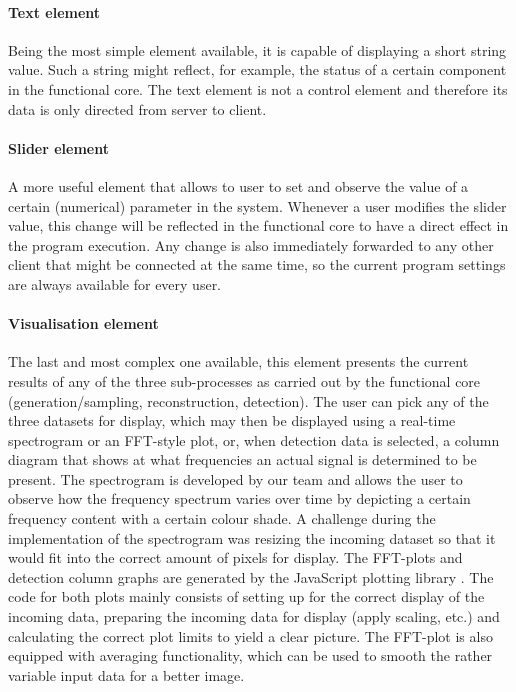 \documentclass[a4paper, openany, oneside]{memoir}
\begin{document}
\paragraph{Text element}
Being the most simple element available, it is capable of displaying a short string value. Such a string might reflect, for example, the status of a certain component in the functional core. The text element is not a control element and therefore its data is only directed from server to client.

\paragraph{Slider element}
A more useful element that allows to user to set and observe the value of a certain (numerical) parameter in the system. Whenever a user modifies the slider value, this change will be reflected in the functional core to have a direct effect in the program execution. Any change is also immediately forwarded to any other client that might be connected at the same time, so the current program settings are always available for every user.

\paragraph{Visualisation element}
The last and most complex one available, this element presents the current results of any of the three sub-processes as carried out by the functional core (generation/sampling, reconstruction, detection). The user can pick any of the three datasets for display, which may then be displayed using a real-time spectrogram or an FFT-style plot, or, when detection data is selected, a column diagram that shows at what frequencies an actual signal is determined to be present.
The spectrogram is developed by our team and allows the user to observe how the frequency spectrum varies over time by depicting a certain frequency content with a certain colour shade. A challenge during the implementation of the spectrogram was resizing the incoming dataset so that it would fit into the correct amount of pixels for display.
The FFT-plots and detection column graphs are generated by the JavaScript plotting library . The code for both plots mainly consists of setting up  for the correct display of the incoming data, preparing the incoming data for display (apply scaling, etc.) and calculating the correct plot limits to yield a clear picture.
The FFT-plot is also equipped with averaging functionality, which can be used to smooth the rather variable input data for a better image.
\end{document}
